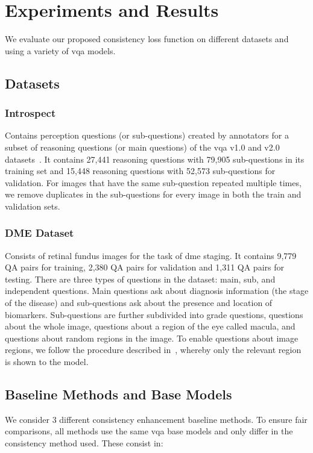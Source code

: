 \section{Experiments and Results}
\label{sec:experiments}

We evaluate our proposed consistency loss function on different datasets and using a variety of \gls{vqa} models.

\subsection{Datasets}
\label{subsec:cons_logic_datasets}

\subsubsection{Introspect~\cite{selvaraju2020squinting} } Contains perception questions (or sub-questions) created by annotators for a subset of reasoning questions (or main questions) of the \gls{vqa} v1.0 and v2.0 datasets~\cite{antol2015vqa,goyal2017making}. It contains 27,441 reasoning questions with 79,905 sub-questions in its training set and 15,448 reasoning questions with 52,573 sub-questions for validation. For images that have the same sub-question repeated multiple times, we remove duplicates in the sub-questions for every image in both the train and validation sets.

\subsubsection{DME Dataset~\cite{tascon2022consistency}} Consists of retinal fundus images for the task of \gls{dme} staging. It contains 9,779 QA pairs for training, 2,380 QA pairs for validation and 1,311 QA pairs for testing. There are three types of questions in the dataset: main, sub, and independent questions. Main questions ask about diagnosis information (\ie the stage of the disease) and sub-questions ask about the presence and location of biomarkers. Sub-questions are further subdivided into grade questions, questions about the whole image, questions about a region of the eye called macula, and questions about random regions in the image. To enable questions about image regions, we follow the procedure described in~\cite{tascon2022consistency}, whereby only the relevant region is shown to the model.



\subsection{Baseline Methods and Base Models} We consider 3 different consistency enhancement baseline methods. To ensure fair comparisons, all methods use the same \gls{vqa} base models and only differ in the consistency method used. These consist in:\\


